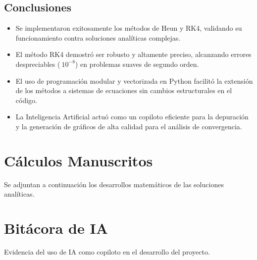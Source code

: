 	\section{Conclusiones}
	\begin{itemize}
		\item Se implementaron exitosamente los métodos de Heun y RK4, validando su funcionamiento contra soluciones analíticas complejas.
		\item El método RK4 demostró ser robusto y altamente preciso, alcanzando errores despreciables ($~10^{-8}$) en problemas suaves de segundo orden.
		\item El uso de programación modular y vectorizada en Python facilitó la extensión de los métodos a sistemas de ecuaciones sin cambios estructurales en el código.
		\item La Inteligencia Artificial actuó como un copiloto eficiente para la depuración y la generación de gráficos de alta calidad para el análisis de convergencia.
	\end{itemize}
	
	\printbibliography
	
	\appendix
	
	\chapter{Cálculos Manuscritos}
	Se adjuntan a continuación los desarrollos matemáticos de las soluciones analíticas.
	
	\chapter{Bitácora de IA}
	Evidencia del uso de IA como copiloto en el desarrollo del proyecto.
	
